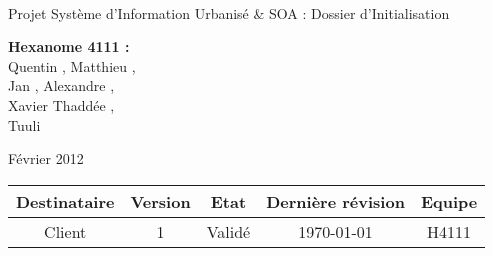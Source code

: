 \documentclass[a4paper]{article}
\begin{document}
\begin{titlepage}
~ 
\vfill
	\begin{center}
		\begin{Huge}
		Projet Système d'Information Urbanisé \& SOA : Dossier d'Initialisation\\ %
		\end{Huge} 
\vfill
		\textbf{Hexanome 4111 :} 
		\\Quentin {}, Matthieu , 
		\\Jan {}, Alexandre , 
		\\Xavier {}Thaddée ,
		\\Tuuli {}
\vfill		
		\begin{Large}
		Février 2012
		\end{Large}
\vfill
	\begin{tabular}{|c|c|c|c|c|}
 	 \hline
   Destinataire & Version & Etat & Dernière révision & Equipe \\
   \hline
   Client & 1 & Validé & \today & H4111 \\
   \hline
	\end{tabular}
	\end{center}
\vfill
\end{titlepage}
\newpage
\tableofcontents
\newpage


\end{document}
